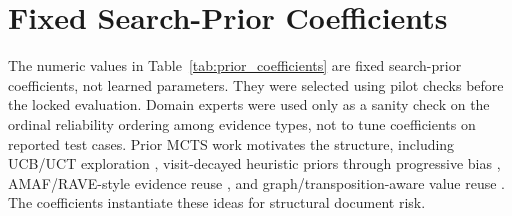 \documentclass[11pt]{article}
\begin{document}
\section{Fixed Search-Prior Coefficients}
\label{app:priors}

The numeric values in Table~\ref{tab:prior_coefficients} are fixed search-prior coefficients, not learned parameters.  They were selected using pilot checks before the locked evaluation.  Domain experts were used only as a sanity check on the ordinal reliability ordering among evidence types, not to tune coefficients on reported test cases.  Prior MCTS work motivates the structure, including UCB/UCT exploration \citep{kocsis2006bandit}, visit-decayed heuristic priors through progressive bias \citep{chaslot2008progressive,browne2012survey}, AMAF/RAVE-style evidence reuse \citep{gelly2007combining}, and graph/transposition-aware value reuse \citep{childs2008transpositions,czech2021monte}.  The coefficients instantiate these ideas for structural document risk.
\end{document}
